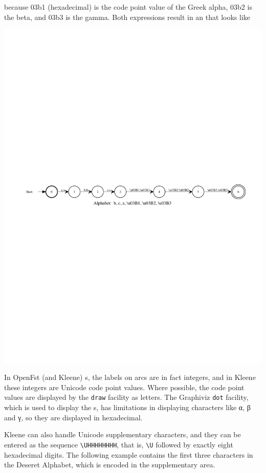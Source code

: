 \noindent
because 03b1 (hexadecimal) is the code point value of the Greek alpha, 03b2 is the beta,
and 03b3 is the gamma.  Both expressions result in an \fsm{} that looks like


\begin{center}
\includegraphics[width=135mm]{images/alphabetagamma.pdf}
\end{center}

\noindent
In OpenFst (and Kleene) \fsm{}s, the labels on arcs are in fact integers,
and in Kleene these integers are Unicode code point values.  Where possible,
the code point values are displayed by the \texttt{draw} facility as
letters.  The Graphiviz \texttt{dot}
facility, which is used to display the \fsm{}s, has limitations in displaying characters
like α, β and γ, so they are displayed in hexadecimal.  

Kleene can also handle Unicode supplementary characters, and they can be entered as the
 sequence
\verb!\UHHHHHHHH!, that is, \verb!\U! followed by exactly eight hexadecimal digits.  The following
example contains the first three characters in the Deseret Alphabet, which is encoded in
the supplementary area.


